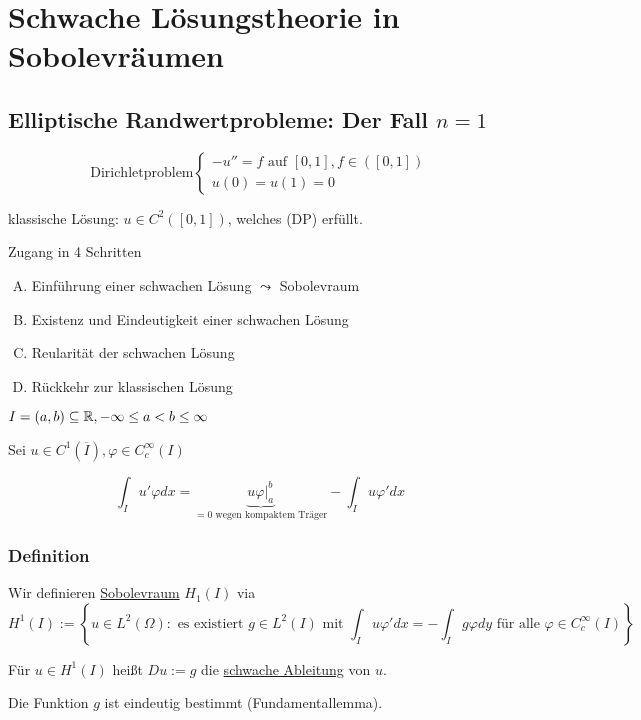 \chapter*{Schwache Lösungstheorie in Sobolevräumen}
\section{Elliptische Randwertprobleme: Der Fall $n = 1$}

$$
\text{Dirichletproblem}
\begin{cases}
  -u'' = f \text{ auf } [0,1], f \in ([0,1]) \\
  u(0) = u(1) = 0
\end{cases}
$$

klassische Lösung: $u \in C^2([0,1])$, welches (DP) erfüllt.

Zugang in 4 Schritten

\begin{enumerate}[(A)]
  \item Einführung einer schwachen Lösung $\leadsto$ Sobolevraum
  \item Existenz und Eindeutigkeit einer schwachen Lösung
  \item Reularität der schwachen Lösung
  \item Rückkehr zur klassischen Lösung
\end{enumerate}

$I = (a,b) \subseteq \mathbb{R}, -\infty \leq a < b \leq \infty$

Sei $u \in C^1(\overline I), \varphi \in C_c^\infty(I)$

$$ \int_I u' \varphi dx = \underbrace{u \varphi|_a^b}_{= 0 \text{ wegen kompaktem Träger}} - \int_I u \varphi' dx$$

\subsection{Definition}

Wir definieren \underline{Sobolevraum} $H_1(I)$ via
$$
H^1(I) := \left\{ u \in L^2(\Omega) \colon \text{ es existiert } g \in L^2(I) \text{ mit } \int_I u\varphi' dx = - \int_I g\varphi dy \text{ für alle } \varphi \in C_c^\infty(I)\right\}
$$

Für $u \in H^1(I)$ heißt $Du := g$ die \underline{schwache Ableitung} von $u$.

\begin{bem}
Die Funktion $g$ ist eindeutig bestimmt (Fundamentallemma).
\end{bem}

